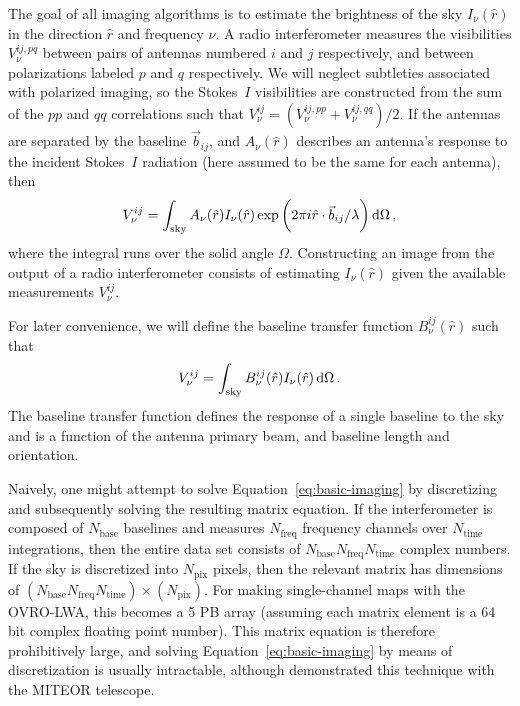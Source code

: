 \begin{bibunit}
The goal of all imaging algorithms is to estimate the brightness of the sky $I_\nu(\hat r)$ in the
direction $\hat r$ and frequency $\nu$.  A radio interferometer measures the visibilities
$V^{ij,pq}_{\nu}$ between pairs of antennas numbered $i$ and $j$ respectively, and between
polarizations labeled $p$ and $q$ respectively. We will neglect subtleties associated with polarized
imaging, so the Stokes~$I$ visibilities are constructed from the sum of the $pp$ and $qq$
correlations such that $V^{ij}_{\nu} = (V^{ij,pp}_{\nu}+V^{ij,qq}_{\nu})/2$.  If the antennas are
separated by the baseline $\vec b_{ij}$, and $A_\nu(\hat r)$ describes an antenna's response to the
incident Stokes~$I$ radiation (here assumed to be the same for each antenna), then
\begin{equation}\label{eq:basic-imaging}
    V^{ij}_\nu = \int_\text{sky}
                 A_\nu(\hat r) I_\nu(\hat r)
                 \exp\bigg(2\pi i \hat r\cdot\vec b_{ij}/\lambda\bigg) \,{\textrm d}\Omega \, ,
\end{equation}
where the integral runs over the solid angle $\Omega$.  Constructing an image from the output of a
radio interferometer consists of estimating $I_\nu(\hat r)$ given the available measurements
$V^{ij}_\nu$.

For later convenience, we will define the baseline transfer function $B^{ij}_\nu(\hat r)$ such that
\begin{equation}\label{eq:baseline-transfer-function}
    V^{ij}_\nu = \int_\text{sky} B^{ij}_\nu(\hat r) I_\nu(\hat r) \,{\textrm d}\Omega \, .
\end{equation}
The baseline transfer function defines the response of a single baseline to the sky and is a
function of the antenna primary beam, and baseline length and orientation.

Naively, one might attempt to solve Equation~\ref{eq:basic-imaging} by discretizing and
subsequently solving the resulting matrix equation. If the interferometer is composed of
$N_\text{base}$ baselines and measures $N_\text{freq}$ frequency channels over $N_\text{time}$
integrations, then the entire data set consists of $N_\text{base}N_\text{freq}N_\text{time}$ complex
numbers. If the sky is discretized into $N_\text{pix}$ pixels, then the relevant matrix has
dimensions of $(N_\text{base}N_\text{freq}N_\text{time})\times(N_\text{pix})$. For making
single-channel maps with the OVRO-LWA, this becomes a 5 PB array (assuming each matrix element
is a 64 bit complex floating point number).  This matrix equation is therefore prohibitively large,
and solving Equation~\ref{eq:basic-imaging} by means of discretization is usually intractable,
although \citet{2017MNRAS.465.2901Z} demonstrated this technique with the MITEOR telescope.


\end{bibunit}
